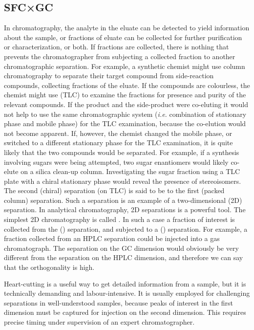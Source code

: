 \subsection{SFC×GC}
\label{sec:SFCxGC}
In chromatography, the analyte in the eluate can be detected to yield
information about the sample, or fractions of eluate can be collected for
further purification or characterization, or both. If fractions are collected,
there is nothing that prevents the chromatographer from subjecting a collected
fraction to another chromatographic separation. For example, a synthetic chemist
might use column chromatography to separate their target compound from
side-reaction compounds, collecting fractions of the eluate. If the compounds
are colourless, the chemist might use  (TLC)
to examine the fractions for presence and purity of the relevant compounds. If
the product and the side-product were co-eluting it would not help to use the
same chromatographic system (\textit{i.e.} combination of stationary phase and
mobile phase) for the TLC examination, because the co-elution would not become
apparent. If, however, the chemist changed the mobile phase, or switched to a
different stationary phase for the TLC examination, it is quite likely that the
two compounds would be separated. For example, if a synthesis involving sugars
were being attempted, two sugar enantiomers would likely co-elute on a silica
clean-up column. Investigating the sugar fraction using a TLC plate with a
chiral stationary phase would reveal the presence of stereoisomers. The second
(chiral) separation (on TLC) is said to be  to the first
(packed column) separation. Such a separation is an example of a two-dimensional
(2D) separation. In analytical chromatography, 2D separations is a powerful
tool. The simplest 2D chromatography is called . In such
a case a fraction of interest is collected from the 
(\oneD) separation, and subjected to a  (\twoD)
separation. For example, a fraction collected from an HPLC separation could be
injected into a gas chromatograph.
The separation on the GC dimension would obviously be very different from the
separation on the HPLC dimension, and therefore we can say that the
orthogonality is high.

Heart-cutting is a useful way to get detailed information from a sample, but it
is technically demanding and labour-intensive. It is usually employed for
challenging separations in well-understood samples, because peaks of interest in
the first dimension must be captured for injection on the second dimension. This
requires precise timing under supervision of an expert chromatographer.


